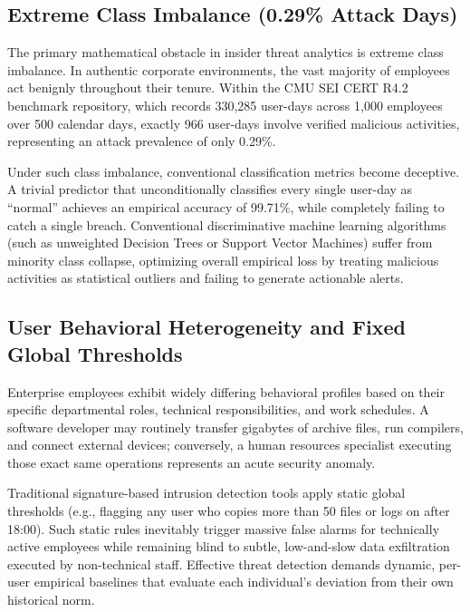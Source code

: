 \documentclass[12pt,a4paper]{report}
\begin{document}
\subsection{Extreme Class Imbalance (0.29\% Attack Days)}
The primary mathematical obstacle in insider threat analytics is extreme class imbalance. In authentic corporate environments, the vast majority of employees act benignly throughout their tenure. Within the CMU SEI CERT R4.2 benchmark repository, which records 330,285 user-days across 1,000 employees over 500 calendar days, exactly 966 user-days involve verified malicious activities, representing an attack prevalence of only 0.29\%. 

Under such class imbalance, conventional classification metrics become deceptive. A trivial predictor that unconditionally classifies every single user-day as ``normal'' achieves an empirical accuracy of 99.71\%, while completely failing to catch a single breach. Conventional discriminative machine learning algorithms (such as unweighted Decision Trees or Support Vector Machines) suffer from minority class collapse, optimizing overall empirical loss by treating malicious activities as statistical outliers and failing to generate actionable alerts.

\subsection{User Behavioral Heterogeneity and Fixed Global Thresholds}
Enterprise employees exhibit widely differing behavioral profiles based on their specific departmental roles, technical responsibilities, and work schedules. A software developer may routinely transfer gigabytes of archive files, run compilers, and connect external devices; conversely, a human resources specialist executing those exact same operations represents an acute security anomaly.

Traditional signature-based intrusion detection tools apply static global thresholds (e.g., flagging any user who copies more than 50 files or logs on after 18:00). Such static rules inevitably trigger massive false alarms for technically active employees while remaining blind to subtle, low-and-slow data exfiltration executed by non-technical staff. Effective threat detection demands dynamic, per-user empirical baselines that evaluate each individual's deviation from their own historical norm.
\end{document}
